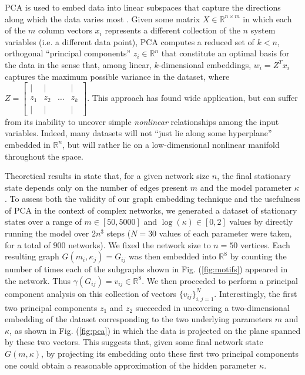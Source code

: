   PCA is used to embed data into linear subspaces that capture the
  directions along which the data varies most
  \cite{jolliffe_principal_2014}.
  Given some matrix $X \in \mathbb{R}^{n \times m}$ in which each of
  the $m$ column vectors $x_i$ represents a different collection of
  the $n$ system variables (i.e. a different data point), PCA computes
  a reduced set of $k<n$, orthogonal ``principal components''
  $z_i \in \mathbb{R}^n$ that constitute an optimal basis for the data
  in the sense that, among linear, $k$-dimensional embeddings,
  $w_i = Z^Tx_i$ captures the maximum possible variance in the
  dataset, where
  $Z = \begin{bmatrix} | & | & & | \\ z_1 & z_2 & \hdots & z_k \\ | &
    | & & | \end{bmatrix}$.
  This approach has found wide application, but can suffer from its
  inability to uncover simple \textit{nonlinear} relationships among
  the input variables.
  Indeed, many datasets will not ``just lie along some hyperplane''
  embedded in $\mathbb{R}^n$, but will rather lie on a low-dimensional
  nonlinear manifold throughout the space.

  Theoretical results in \cite{rath_time_2012} state that, for a given
  network size $n$, the final stationary state depends only on the
  number of edges present $m$ and the model parameter $\kappa$.
  To assess both the validity of our graph embedding technique and the
  usefulness of PCA in the context of complex networks, we generated a
  dataset of stationary states over a range of $m \in [50, 5000]$ and
  $\log(\kappa) \in [0, 2]$ values by directly running the model over
  $2n^3$ steps ($N=30$ values of each parameter were taken, for a
  total of $900$ networks).
  We fixed the network size to $n=50$ vertices.
  Each resulting graph $G(m_i, \kappa_j) = G_{ij}$ was then embedded
  into $\mathbb{R}^8$ by counting the number of times each of the
  subgraphs shown in Fig. (\ref{fig:motifs}) appeared in the network.
  Thus $\gamma(G_{ij}) = v_{ij} \in \mathbb{R}^8$.
  We then proceeded to perform a principal component analysis on this
  collection of vectors $\{v_{ij}\}_{i,j=1}^N$.
  Interestingly, the first two principal components $z_1$ and $z_2$
  succeeded in uncovering a two-dimensional embedding of the dataset
  corresponding to the two underlying parameters $m$ and $\kappa$, as
  shown in Fig. (\ref{fig:pca}) in which the data is projected on the
  plane spanned by these two vectors.
  This suggests that, given some final network state $G(m, \kappa)$,
  by projecting its embedding onto these first two principal
  components one could obtain a reasonable approximation of the hidden
  parameter $\kappa$.

